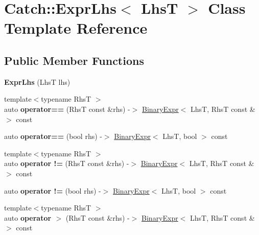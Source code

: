 \hypertarget{classCatch_1_1ExprLhs}{}\section{Catch\+::Expr\+Lhs$<$ LhsT $>$ Class Template Reference}
\label{classCatch_1_1ExprLhs}
\subsection*{Public Member Functions}
\begin{DoxyCompactItemize}
\item 
\mbox{\label{classCatch_1_1ExprLhs_ad22c6af1a7d6993240624d299714a479}} 
{\bfseries Expr\+Lhs} (LhsT lhs)
\item 
\mbox{\label{classCatch_1_1ExprLhs_af218aaf7b5b0a0ebb6b3697f2c89893d}} 
{\footnotesize template$<$typename RhsT $>$ }\\auto {\bfseries operator==} (RhsT const \&rhs) -\/$>$ \mbox{\hyperlink{classCatch_1_1BinaryExpr}{Binary\+Expr}}$<$ LhsT, RhsT const \& $>$ const
\item 
\mbox{\label{classCatch_1_1ExprLhs_ab707a84abdffbdc35962a495e238d393}} 
auto {\bfseries operator==} (bool rhs) -\/$>$ \mbox{\hyperlink{classCatch_1_1BinaryExpr}{Binary\+Expr}}$<$ LhsT, bool $>$ const
\item 
\mbox{\label{classCatch_1_1ExprLhs_af4c6b85fb0d089fcf55d961e1efed5ea}} 
{\footnotesize template$<$typename RhsT $>$ }\\auto {\bfseries operator !=} (RhsT const \&rhs) -\/$>$ \mbox{\hyperlink{classCatch_1_1BinaryExpr}{Binary\+Expr}}$<$ LhsT, RhsT const \& $>$ const
\item 
\mbox{\label{classCatch_1_1ExprLhs_a75c4081701b1e57c32ffbdf124fe4297}} 
auto {\bfseries operator !=} (bool rhs) -\/$>$ \mbox{\hyperlink{classCatch_1_1BinaryExpr}{Binary\+Expr}}$<$ LhsT, bool $>$ const
\item 
\mbox{\label{classCatch_1_1ExprLhs_af4f6dc7eeac031cfdc4fd4b78517e5b8}} 
{\footnotesize template$<$typename RhsT $>$ }\\auto {\bfseries operator $>$} (RhsT const \&rhs) -\/$>$ \mbox{\hyperlink{classCatch_1_1BinaryExpr}{Binary\+Expr}}$<$ LhsT, RhsT const \& $>$ const

\end{DoxyCompactItemize}
